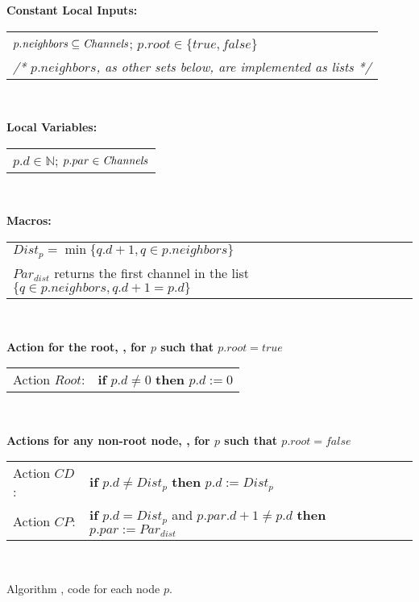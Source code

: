 \begin{algorithm}[htp]
  
  \textbf{Constant Local Inputs:} \hfill\
  
  \begin{tabular}{l}
    $p.\mathit{neighbors} \subseteq \mathit{Channels}$; $p.root \in\{true, false\}$ \\
     \emph{/* $p.\mathit{neighbors}$, as other sets below, are implemented as lists */}
  \end{tabular} \hfill\ 

\smallskip
  
  \textbf{Local Variables:} \hfill\
  
  \begin{tabular}{l}
    $p.d \in \mathds N$; $p.par \in \mathit{Channels}$
  \end{tabular} \hfill\ 

\smallskip
  
  \textbf{Macros:} \hfill\
  
  \begin{tabular}{l}
    $Dist_p = \min \{ q.d + 1, q \in p.\mathit{neighbors} \}$ \\
    $Par_{dist}$ returns the first channel in the list $\{ q \in p.\mathit{neighbors},
    q.d + 1 = p.d \}$
  \end{tabular} \hfill\ 

  \smallskip
  
  \textbf{Action for the root, \ie, for $p$ such that $p.root = true$} \hfill\ 

  \begin{tabular}{ll}
    Action $Root$: & \textbf{if} $p.d \neq 0$ \textbf{then} $p.d := 0$
 \end{tabular} \hfill\ 

  \smallskip
  
  \textbf{Actions for any non-root node, \ie, for $p$ such that $p.root = false$} \hfill\ 
  
  \begin{tabular}{ll}
   Action $CD$:
    & \textbf{if} $p.d \neq Dist_{p}$ \textbf{then} $p.d := Dist_{p}$ \\
     Action $CP$:
    &  \textbf{if} $p.d = Dist_p$ and $p.par.d + 1 \neq p.d$ \textbf{then} $p.par := Par_{dist}$ 
  \end{tabular}  \hfill\ 

   \caption{Algorithm \BFS, code for each node $p$.}
  \label{alg}
\end{algorithm}

